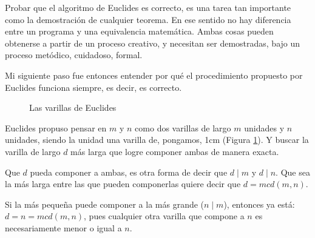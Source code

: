 \documentclass[12pt, a4paper, openany, fleqn]{book}
\begin{document}
    Probar que el algoritmo de Euclides es correcto, es una tarea tan importante como la demostración de cualquier teorema. En ese sentido no hay diferencia entre un programa y una equivalencia matemática. Ambas cosas pueden obtenerse a partir de un proceso creativo, y necesitan ser demostradas, bajo un proceso metódico, cuidadoso, formal.

    Mi siguiente paso fue entonces entender por qué el procedimiento propuesto por Euclides funciona siempre, es decir, es correcto.


    \begin{figure}[h]
        \centering
        \caption{Las varillas de Euclides} \label{varillas_euclides}
    \end{figure}

    Euclides propuso pensar en $m$ y $n$ como dos varillas de largo $m$ unidades y $n$ unidades, siendo la unidad una varilla de, pongamos, 1cm (Figura \ref{varillas_euclides}).
    Y buscar la varilla de largo $d$ más larga que logre componer ambas de manera exacta.

    Que $d$ pueda componer a ambas, es otra forma de decir que $d \mid m$ y $d \mid n$. Que sea la más larga entre las que pueden componerlas quiere decir que $d = mcd(m,n)$.

    Si la más pequeña puede componer a la más grande ($n \mid m$), entonces ya está: $d=n=mcd(m,n)$, pues cualquier otra varilla que compone a $n$ es necesariamente menor o igual a $n$.
\end{document}
